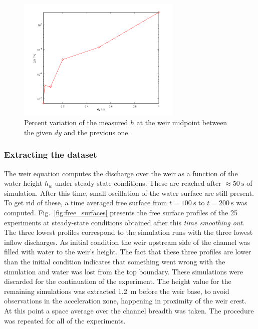 \begin{figure}[h]
  \centering
  \includegraphics[width=0.7\textwidth]{Figures/diff_center.png}
  \caption{Percent variation of the measured $h$ at the weir midpoint between the given $dy$ and the previous one.}
  \label{fig:diff_center}
\end{figure}

\subsubsection{Extracting the dataset}
The weir equation computes the discharge over the weir as a function of the water height $h_w$ under steady-state conditions.
These are reached after $\approx \SI{50}{\s}$ of simulation.
After this time, small oscillation of the water surface are still present.
To get rid of these, a time averaged free surface from $t = \SI{100}{\s}$ to $t = \SI{200}{\s}$ was computed.
Fig.~\ref{fig:free_surfaces} presents the free surface profiles of the \num{25} experiments at steady-state conditions obtained after this \emph{time smoothing out}.
The three lowest profiles correspond to the simulation runs with the three lowest inflow discharges. 
As initial condition the weir upstream side of the channel was filled with water to the weir's height.
The fact that these three profiles are lower than the initial condition indicates that something went wrong with the simulation and water was lost from the top boundary.
These simulations were discarded for the continuation of the experiment.
The height value for the remaining simulations was extracted \SI{1.2}{\m} before the weir base, to avoid observations in the acceleration zone, happening in proximity of the weir crest.
At this point a space average over the channel breadth was taken.
The procedure was repeated for all of the experiments.

